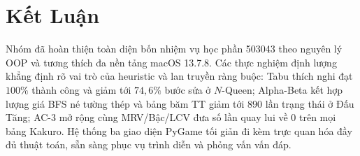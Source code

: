 \documentclass[conference]{IEEEtran}
\begin{document}
\section{Kết Luận}
Nhóm đã hoàn thiện toàn diện bốn nhiệm vụ học phần 503043 theo nguyên lý OOP và tương thích đa nền tảng macOS 13.7.8. Các thực nghiệm định lượng khẳng định rõ vai trò của heuristic và lan truyền ràng buộc: Tabu thích nghi đạt $100\%$ thành công và giảm tới $74,6\%$ bước sửa ở $N$-Queen; Alpha-Beta kết hợp lượng giá BFS né tường thép và bảng băm TT giảm tới $890$ lần trạng thái ở Đấu Tăng; AC-3 mở rộng cùng MRV/Bậc/LCV đưa số lần quay lui về $0$ trên mọi bảng Kakuro. Hệ thống ba giao diện PyGame tối giản đi kèm trực quan hóa đầy đủ thuật toán, sẵn sàng phục vụ trình diễn và phỏng vấn vấn đáp.



\end{document}
